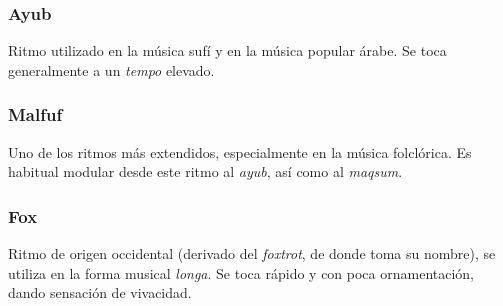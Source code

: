 
\subsubsection{Ayub}

Ritmo utilizado en la música sufí y en la música popular árabe. Se toca generalmente a un \emph{tempo} elevado.

\begin{center}
\end{center}


\subsubsection{Malfuf}

Uno de los ritmos más extendidos, especialmente en la música folclórica. Es habitual modular desde este ritmo al \emph{ayub}, así como al \emph{maqsum}.

\begin{center}
\end{center}


\subsubsection{Fox}

Ritmo de origen occidental (derivado del \emph{foxtrot}, de donde toma su nombre), se utiliza en la forma musical \emph{longa}. Se toca rápido y con poca ornamentación, dando sensación de vivacidad.

\begin{center}
\end{center}

